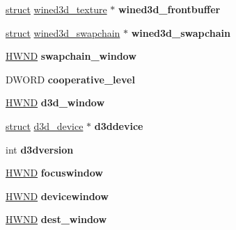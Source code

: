 \begin{DoxyCompactItemize}
\item 
\mbox{\label{structddraw_a46f73fca456f989dceab94224eb78284}} 
\hyperlink{interfacestruct}{struct} \hyperlink{structwined3d__texture}{wined3d\+\_\+texture} $\ast$ {\bfseries wined3d\+\_\+frontbuffer}
\item 
\mbox{\label{structddraw_a4f44aea108fe92a2233636f935df6a90}} 
\hyperlink{interfacestruct}{struct} \hyperlink{structwined3d__swapchain}{wined3d\+\_\+swapchain} $\ast$ {\bfseries wined3d\+\_\+swapchain}
\item 
\mbox{\label{structddraw_a6f90efb92a290d547687fdafff7ac2dd}} 
\hyperlink{interfacevoid}{H\+W\+ND} {\bfseries swapchain\+\_\+window}
\item 
\mbox{\label{structddraw_a4d20d85fb65b001f945775cee044ebbe}} 
D\+W\+O\+RD {\bfseries cooperative\+\_\+level}
\item 
\mbox{\label{structddraw_a19257edc79a1f72b461a44d7241c3109}} 
\hyperlink{interfacevoid}{H\+W\+ND} {\bfseries d3d\+\_\+window}
\item 
\mbox{\label{structddraw_a0f7af778431344e2dd5a10844805f738}} 
\hyperlink{interfacestruct}{struct} \hyperlink{structd3d__device}{d3d\+\_\+device} $\ast$ {\bfseries d3ddevice}
\item 
\mbox{\label{structddraw_ad6cbb81f9a074a2d3a2049b00745ca14}} 
int {\bfseries d3dversion}
\item 
\mbox{\label{structddraw_acbb87a690583d67fbf007b3c8e96b933}} 
\hyperlink{interfacevoid}{H\+W\+ND} {\bfseries focuswindow}
\item 
\mbox{\label{structddraw_a2e1f314b0807fa65a9f98cce180b4d09}} 
\hyperlink{interfacevoid}{H\+W\+ND} {\bfseries devicewindow}
\item 
\mbox{\label{structddraw_aa178b4468026188fd2ec43129dc26db9}} 
\hyperlink{interfacevoid}{H\+W\+ND} {\bfseries dest\+\_\+window}
\item 
\mbox{\label{structddraw_a93f4b68672464b9d2ebaaecb3e305542}} 

\end{DoxyCompactItemize}
